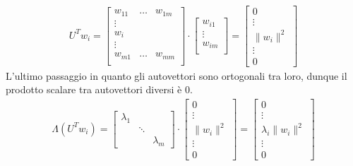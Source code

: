 \begin{gather*}
	U^{T}w_i=
	\begin{bmatrix}
		w_{11} & \ldots & w_{1m} \\
		\vdots &        &        \\
		w_i    &        &        \\
		\vdots &        &        \\
		w_{m1} & \ldots & w_{mm} \\
	\end{bmatrix}
	\cdot
	\begin{bmatrix}
		w_{i1} \\
		\vdots \\
		w_{im} \\
	\end{bmatrix}
	=\begin{bmatrix}
		0         \\
		\vdots    \\
		\|w_i\|^2 \\
		\vdots    \\
		0
	\end{bmatrix}
\end{gather*}
L'ultimo passaggio in quanto gli autovettori sono ortogonali tra loro, dunque il prodotto scalare tra autovettori diversi è 0.
\begin{gather*}
	\Lambda (U^{T}w_i)=
	\begin{bmatrix}
		\lambda_1 &        &           \\
		          & \ddots &           \\
		          &        & \lambda_m
	\end{bmatrix}
	\cdot
	\begin{bmatrix}
		0         \\
		\vdots    \\
		\|w_i\|^2 \\
		\vdots    \\
		0
	\end{bmatrix}
	=
	\begin{bmatrix}
		0                   \\
		\vdots              \\
		\lambda_i \|w_i\|^2 \\
		\vdots              \\
		0
	\end{bmatrix}
\end{gather*}
